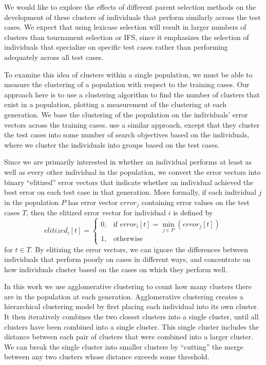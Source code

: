 We would like to explore the effects of different parent selection methods on the development of these clusters of individuals that perform similarly across the test cases. We expect that using lexicase selection will result in larger numbers of clusters than tournament selection or IFS, since it emphasizes the selection of individuals that specialize on specific test cases rather than performing adequately across all test cases.

To examine this idea of clusters within a single population, we must be able to measure the clustering of a population with respect to the training cases. Our approach here is to use a clustering algorithm to find the number of clusters that exist in a population, plotting a measurement of the clustering at each generation. We base the clustering of the population on the individuals' error vectors across the training cases. \cite{Krawiec:2015:EuroGP} use a similar approach, except that they cluster the test cases into some number of search objectives based on the individuals, where we cluster the individuals into groups based on the test cases.


Since we are primarily interested in whether an individual performs at least as well as every other 
individual in the population, we convert the error vectors into binary ``elitized'' error vectors 
that indicate whether an individual achieved the best error on each test case in that generation. 
More formally, if each individual $j$ in the population $P$ has error vector $error_j$ containing error values on the test cases $T$, then the elitized error vector for individual $i$ is defined by
\[
elitized_i[t] =
\begin{cases}
    0,         & \text{if } error_i[t] = \min\limits_{j \in P} (error_j[t])  \\
    1,         & \text{otherwise}
\end{cases}
\]
for $t \in T$.
By elitizing the error vectors, we can ignore the differences between individuals that perform poorly on cases in different 
ways, and concentrate on how individuals cluster based on the cases on which they perform well.

In this work we use agglomerative clustering to count how many clusters there are in the population 
at each generation. Agglomerative clustering creates 
a hierarchical clustering model by first placing each individual into its own cluster. It then 
iteratively combines the two closest clusters into a single cluster, until all clusters have been 
combined into a single cluster. This single cluster includes the distance between each pair of clusters 
that were combined into a larger cluster. We can break the single cluster into smaller clusters by
``cutting'' the merge between any two clusters whose distance exceeds some threshold.

